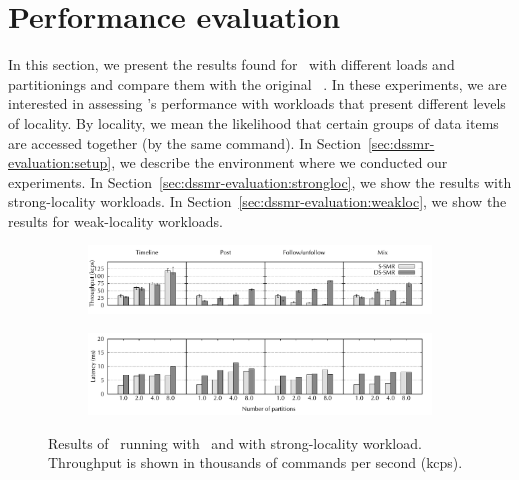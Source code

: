 \section{Performance evaluation}
\label{sec:dssmr-experiments}

In this section, we present the results found for \dssmrappname\ with different
loads and partitionings and compare them with the original
\ssmr{}~\cite{bezerra2014ssmr}. In these experiments, we are interested in
assessing \dssmr{}'s performance with workloads that present different levels of
locality. By locality, we mean the likelihood that certain groups of data items
are accessed together (by the same command). In
Section~\ref{sec:dssmr-evaluation:setup}, we describe the environment where we
conducted our experiments. In Section~\ref{sec:dssmr-evaluation:strongloc}, we
show the results with strong-locality workloads. In
Section~\ref{sec:dssmr-evaluation:weakloc}, we show the results for
weak-locality workloads.

\begin{figure}[ht!]
\centering
\begin{subfigure}{1\columnwidth}
      \centering
      \includegraphics[width=\textwidth]{./figures/experiments/dssmr/dssmr-strong-locality-tp}
\end{subfigure}
\begin{subfigure}{1\columnwidth}
      \centering
      \includegraphics[width=\textwidth]{./figures/experiments/dssmr/dssmr-strong-locality-lat}
\end{subfigure}
\caption{Results of \dssmrappname\ running with \ssmr\ and \dssmr{} with strong-locality workload. Throughput is shown in thousands of commands per second (kcps).}
\label{fig:dssmr-strongloc}
\end{figure}



